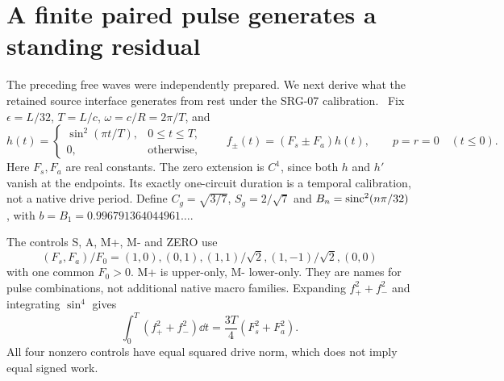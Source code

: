 \section{A finite paired pulse generates a standing residual}\label{sec:pulse}
The preceding free waves were independently prepared. We next derive what the retained source interface generates from rest under the SRG-07 calibration.~\cite{SRG07} Fix $\epsilon=L/32$, $T=L/c$, $\omega=c/R=2\pi/T$, and
\begin{equation}\label{eq:pulse}
 h(t)=\begin{cases}\sin^2(\pi t/T),&0\le t\le T,\\0,&\text{otherwise},\end{cases}
 \qquad f_\pm(t)=(F_s\pm F_a)h(t),\qquad p=r=0\quad(t\le0).
\end{equation}
Here $F_s,F_a$ are real constants. The zero extension is $C^1$, since both $h$ and $h'$ vanish at the endpoints. Its exactly one-circuit duration is a temporal calibration, not a native drive period. Define $C_g=\sqrt{3/7}$, $S_g=2/\sqrt7$ and $B_n=\operatorname{sinc}^2(n\pi/32)$, with $b=B_1=0.996791364044961\ldots$.

The controls S, A, M+, M- and ZERO use
\begin{equation}\label{eq:pulsecontrols}
 (F_s,F_a)/F_0=(1,0),(0,1),(1,1)/\sqrt2,(1,-1)/\sqrt2,(0,0)
\end{equation}
with one common $F_0>0$. M+ is upper-only, M- lower-only. They are names for pulse combinations, not additional native macro families. Expanding $f_+^2+f_-^2$ and integrating $\sin^4$ gives
\begin{equation}\label{eq:drivenorm}
 \int_0^T(f_+^2+f_-^2)\dd t=\frac{3T}{4}(F_s^2+F_a^2).
\end{equation}
All four nonzero controls have equal squared drive norm, which does not imply equal signed work.

